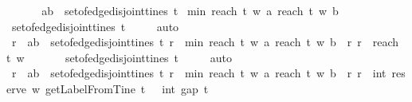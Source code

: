 \begin{isabellebody}
\ \ \isamarkupfalse%
\ \isamarkupfalse%
\ {\isachardoublequoteopen}{\isasymforall}\ {\isacharparenleft}a{\isacharcomma}b{\isacharparenright}\ {\isasymin}\ set{\isacharunderscore}of{\isacharunderscore}edge{\isacharunderscore}disjoint{\isacharunderscore}tines\ t{\isachardot}\ \isanewline
min\ {\isacharparenleft}reach\ t\ w\ a{\isacharparenright}\ {\isacharparenleft}reach\ t\ w\ b{\isacharparenright}\ {\isasymge}\ {}{\isachardoublequoteclose}\isanewline
\ \ \ \ \isamarkupfalse%
\ {\isacartoucheopen}set{\isacharunderscore}of{\isacharunderscore}edge{\isacharunderscore}disjoint{\isacharunderscore}tines\ t\ {\isacharequal}\ {\isacharbraceleft}{\isacharparenleft}{\isacharbrackleft}{\isacharbrackright}{\isacharcomma}\ {\isacharbrackleft}{\isacharbrackright}{\isacharparenright}{\isacharbraceright}{\isacartoucheclose}\ \isamarkupfalse%
\ auto\isanewline
\ \ \isamarkupfalse%
\ \isamarkupfalse%
\ {\isachardoublequoteopen}{\isacharbraceleft}r{\isachardot}\ {\isasymexists}\ {\isacharparenleft}a{\isacharcomma}b{\isacharparenright}\ {\isasymin}\ set{\isacharunderscore}of{\isacharunderscore}edge{\isacharunderscore}disjoint{\isacharunderscore}tines\ t{\isachardot}\ r\ {\isacharequal}\ min\ {\isacharparenleft}reach\ t\ w\ a{\isacharparenright}\ {\isacharparenleft}reach\ t\ w\ b{\isacharparenright}{\isacharbraceright}\ {\isacharequal}\ {\isacharbraceleft}r{\isachardot}\ r\ {\isacharequal}\ reach\ t\ w\ {\isacharbrackleft}{\isacharbrackright}{\isacharbraceright}{\isachardoublequoteclose}\isanewline
\ \ \ \ \isamarkupfalse%
\ {\isacartoucheopen}set{\isacharunderscore}of{\isacharunderscore}edge{\isacharunderscore}disjoint{\isacharunderscore}tines\ t\ {\isacharequal}\ {\isacharbraceleft}{\isacharparenleft}{\isacharbrackleft}{\isacharbrackright}{\isacharcomma}\ {\isacharbrackleft}{\isacharbrackright}{\isacharparenright}{\isacharbraceright}{\isacartoucheclose}\ \isamarkupfalse%
\ auto\isanewline
\ \ \isamarkupfalse%
\ {\isachardoublequoteopen}{\isacharbraceleft}r{\isachardot}\ {\isasymexists}\ {\isacharparenleft}a{\isacharcomma}b{\isacharparenright}\ {\isasymin}\ set{\isacharunderscore}of{\isacharunderscore}edge{\isacharunderscore}disjoint{\isacharunderscore}tines\ t{\isachardot}\ r\ {\isacharequal}\ min\ {\isacharparenleft}reach\ t\ w\ a{\isacharparenright}\ {\isacharparenleft}reach\ t\ w\ b{\isacharparenright}{\isacharbraceright}\ {\isacharequal}\ {\isacharbraceleft}r{\isachardot}\ r\ {\isacharequal}\ int\ {\isacharparenleft}reserve\ w\ {\isacharparenleft}getLabelFromTine\ t\ {\isacharbrackleft}{\isacharbrackright}{\isacharparenright}{\isacharparenright}\ {\isacharminus}\ int\ {\isacharparenleft}gap\ t\ {\isacharbrackleft}{\isacharbrackright}{\isacharparenright}{\isacharbraceright}{\isachardoublequoteclose}\isanewline

\end{isabellebody}
